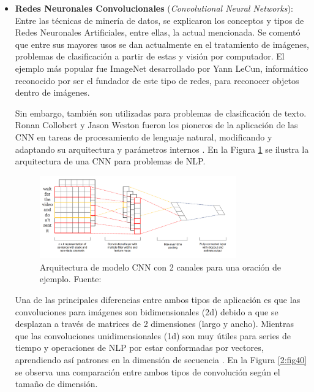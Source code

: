 \begin{itemize}
	\item \textbf{Redes Neuronales Convolucionales} (\textit{Convolutional Neural Networks}): Entre las técnicas de minería de datos, se explicaron los conceptos y tipos de Redes Neuronales Artificiales, entre ellas, la actual mencionada. Se comentó que entre sus mayores usos se dan actualmente en el tratamiento de imágenes, problemas de clasificación a partir de estas y visión por computador. El ejemplo más popular fue ImageNet desarrollado por Yann LeCun, informático reconocido por ser el fundador de este tipo de redes, para reconocer objetos dentro de imágenes.
	
	Sin embargo, también son utilizadas para problemas de clasificación de texto. Ronan Collobert y Jason Weston fueron los pioneros de la aplicación de las CNN en tareas de procesamiento de lenguaje natural, modificando y adaptando su arquitectura y parámetros internos \parencite{bk_kamath2019deeplearning_nlp_sr}. En la Figura \ref{2:fig39} se ilustra la arquitectura de una CNN para problemas de NLP.
	\begin{figure}[!ht]
		\begin{center}
			\includegraphics[width=0.8\textwidth]{2/figures/cnn_nlp.png}
			\caption{Arquitectura de modelo CNN con 2 canales para una oración de ejemplo. Fuente: \cite{tec_kim2014convolutional}}
			\label{2:fig39}
		\end{center}
	\end{figure}
	
	Una de las principales diferencias entre ambos tipos de aplicación es que las convoluciones para imágenes son bidimensionales (2d) debido a que se desplazan a través de matrices de 2 dimensiones (largo y ancho). Mientras que las convoluciones unidimensionales (1d) son muy útiles para series de tiempo y operaciones de NLP por estar conformadas por vectores, aprendiendo así patrones en la dimensión de secuencia \parencite{bk_rao2019nlp_pytorch}. En la Figura \ref{2:fig40} se observa una comparación entre ambos tipos de convolución según el tamaño de dimensión.


\end{itemize}
